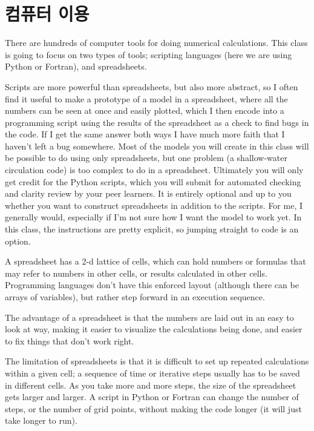\chapter{컴퓨터 이용}

There are hundreds of computer tools for doing numerical calculations. This class is going to focus on two types of tools; scripting languages (here we are using Python or Fortran), and spreadsheets.

Scripts are more powerful than spreadsheets, but also more abstract, so I often find it useful to make a prototype of a model in a spreadsheet, where all the numbers can be seen at once and easily plotted, which I then encode into a programming script using the results of the spreadsheet as a check to find bugs in the code. If I get the same answer both ways I have much more faith that I haven't left a bug somewhere. Most of the models you will create in this class will be possible to do using only spreadsheets, but one problem (a shallow-water circulation code) is too complex to do in a spreadsheet. Ultimately you will only get credit for the Python scripts, which you will submit for automated checking and clarity review by your peer learners. It is entirely optional and up to you whether you want to construct spreadsheets in addition to the scripts. For me, I generally would, especially if I'm not sure how I want the model to work yet. In this class, the instructions are pretty explicit, so jumping straight to code is an option.

A spreadsheet has a 2-d lattice of cells, which can hold numbers or formulas that may refer to numbers in other cells, or results calculated in other cells. Programming languages don’t have this enforced layout (although there can be arrays of variables), but rather step forward in an execution sequence.

The advantage of a spreadsheet is that the numbers are laid out in an easy to look at way, making it easier to visualize the calculations being done, and easier to fix things that don’t work right.

The limitation of spreadsheets is that it is difficult to set up repeated calculations within a given cell; a sequence of time or iterative steps usually has to be saved in different cells. As you take more and more steps, the size of the spreadsheet gets larger and larger. A script in Python or Fortran can change the number of steps, or the number of grid points, without making the code longer (it will just take longer to run).

